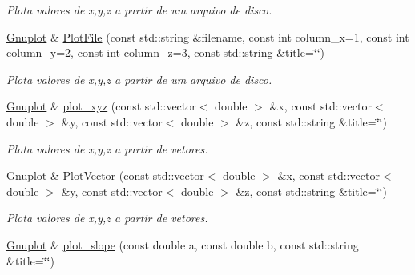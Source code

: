 \begin{DoxyCompactItemize}
\begin{DoxyCompactList}\small\item\em Plota valores de x,y,z a partir de um arquivo de disco. \end{DoxyCompactList}\item 
\hypertarget{classGnuplot_a3f5f7127182ea22da3ee0b78f0ade35c}{\hyperlink{classGnuplot}{Gnuplot} \& \hyperlink{classGnuplot_a3f5f7127182ea22da3ee0b78f0ade35c}{Plot\-File} (const std\-::string \&filename, const int column\-\_\-x=1, const int column\-\_\-y=2, const int column\-\_\-z=3, const std\-::string \&title=\char`\"{}\char`\"{})}\label{classGnuplot_a3f5f7127182ea22da3ee0b78f0ade35c}

\begin{DoxyCompactList}\small\item\em Plota valores de x,y,z a partir de um arquivo de disco. \end{DoxyCompactList}\item 
\hypertarget{classGnuplot_aee30f21a00a4f31c8356a2ef1f0e26e3}{\hyperlink{classGnuplot}{Gnuplot} \& \hyperlink{classGnuplot_aee30f21a00a4f31c8356a2ef1f0e26e3}{plot\-\_\-xyz} (const std\-::vector$<$ double $>$ \&x, const std\-::vector$<$ double $>$ \&y, const std\-::vector$<$ double $>$ \&z, const std\-::string \&title=\char`\"{}\char`\"{})}\label{classGnuplot_aee30f21a00a4f31c8356a2ef1f0e26e3}

\begin{DoxyCompactList}\small\item\em Plota valores de x,y,z a partir de vetores. \end{DoxyCompactList}\item 
\hypertarget{classGnuplot_a239b222cd7ff6ba4a60d583b22248a4f}{\hyperlink{classGnuplot}{Gnuplot} \& \hyperlink{classGnuplot_a239b222cd7ff6ba4a60d583b22248a4f}{Plot\-Vector} (const std\-::vector$<$ double $>$ \&x, const std\-::vector$<$ double $>$ \&y, const std\-::vector$<$ double $>$ \&z, const std\-::string \&title=\char`\"{}\char`\"{})}\label{classGnuplot_a239b222cd7ff6ba4a60d583b22248a4f}

\begin{DoxyCompactList}\small\item\em Plota valores de x,y,z a partir de vetores. \end{DoxyCompactList}\item 
\hypertarget{classGnuplot_a51ea5105eb87285820bb93910f8d346c}{\hyperlink{classGnuplot}{Gnuplot} \& \hyperlink{classGnuplot_a51ea5105eb87285820bb93910f8d346c}{plot\-\_\-slope} (const double a, const double b, const std\-::string \&title=\char`\"{}\char`\"{})}\label{classGnuplot_a51ea5105eb87285820bb93910f8d346c}


\end{DoxyCompactItemize}
